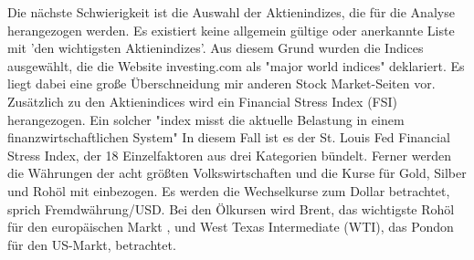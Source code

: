 \newline
Die nächste Schwierigkeit ist die Auswahl der Aktienindizes, die für die Analyse herangezogen werden. Es existiert keine allgemein gültige oder anerkannte Liste mit 'den wichtigsten Aktienindizes'. Aus diesem Grund wurden die Indices ausgewählt, die die Website investing.com als "major world indices" deklariert.\citep{fusion_media_limited_major_2017} Es liegt dabei eine große Überschneidung mir anderen Stock Market-Seiten vor. Zusätzlich zu den Aktienindices wird ein Financial Stress Index (FSI) herangezogen. Ein solcher "index misst die aktuelle Belastung in einem finanzwirtschaftlichen System"\citep[S.~1; eigene Übersetzung]{vermeulen_financial_2014} In diesem Fall ist es der St. Louis Fed Financial Stress Index, der 18 Einzelfaktoren aus drei Kategorien bündelt.\citep{federal_reserve_bank_of_st._louis_st._2017}
\newline
Ferner werden die Währungen der acht größten Volkswirtschaften\citep{the_international_monetary_fund_world_2017} und die Kurse für Gold, Silber und Rohöl mit einbezogen. Es werden die Wechselkurse zum Dollar betrachtet, sprich Fremdwährung/USD. Bei den Ölkursen wird Brent, das wichtigste Rohöl für den europäischen Markt \citep{noauthor_brent_2016}, und West Texas Intermediate (WTI), das Pondon für den US-Markt, betrachtet\citep{noauthor_west_2017}.

